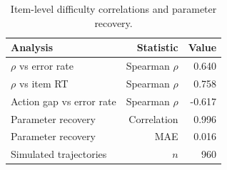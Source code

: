 \begin{table}[htbp]
\centering
\caption{Item-level difficulty correlations and parameter recovery.}
\label{tab:item-recovery}
\begin{tabular}{l r r}
\toprule
Analysis & Statistic & Value \\
\midrule
$\rho$ vs error rate & Spearman $\rho$ & 0.640 \\
$\rho$ vs item RT & Spearman $\rho$ & 0.758 \\
Action gap vs error rate & Spearman $\rho$ & -0.617 \\
Parameter recovery & Correlation & 0.996 \\
Parameter recovery & MAE & 0.016 \\
Simulated trajectories & $n$ & 960 \\
\bottomrule
\end{tabular}
\end{table}
